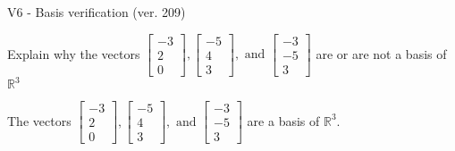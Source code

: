 \begin{exercise}
  \begin{exerciseTitle}V6 - Basis verification (ver. 209)\end{exerciseTitle}
  \begin{exerciseStatement}
    Explain why the vectors \(\left[\begin{array}{r}
-3 \\
2 \\
0
\end{array}\right] , \left[\begin{array}{r}
-5 \\
4 \\
3
\end{array}\right] , \text{ and } \left[\begin{array}{r}
-3 \\
-5 \\
3
\end{array}\right]\) are or are not a basis of \(\mathbb{R}^3\)	


  \end{exerciseStatement}
  \begin{exerciseAnswer}
   The vectors \(\left[\begin{array}{r}
-3 \\
2 \\
0
\end{array}\right] , \left[\begin{array}{r}
-5 \\
4 \\
3
\end{array}\right] , \text{ and } \left[\begin{array}{r}
-3 \\
-5 \\
3
\end{array}\right]\) 
  	 are  a basis of \(\mathbb{R}^3\).
  


  \end{exerciseAnswer}
\end{exercise}
